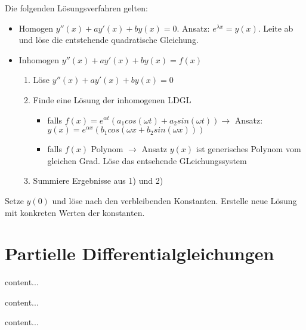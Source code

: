 \begin{satz}
	Die folgenden Lösungsverfahren gelten:
	
	\begin{itemize}
		\item Homogen $y''(x) + a y'(x) + b y(x) = 0$. Ansatz: $e^{\lambda x} = y(x)$. Leite ab und löse die entstehende quadratische Gleichung.
		\item Inhomogen $y''(x) + a y'(x) + b y(x) = f(x) $
		\begin{enumerate} [noitemsep]
			\item Löse $y''(x) + a y'(x) + b y(x) = 0$
			\item Finde eine Lösung der inhomogenen LDGL 
			\begin{itemize}
				\item falls $f(x) = e^{\alpha t} (a_1 cos(\omega t) + a_2 sin(\omega t)) \rightarrow $ Ansatz: $y(x) = e^{\alpha x} (b_1 cos(\omega x + b_2 sin(\omega x)))$
				\item falls $f(x)$ Polynom $\rightarrow$ Ansatz $y(x)$ ist generisches Polynom vom gleichen Grad. Löse das entsehende GLeichungssystem
			\end{itemize}
			\item Summiere Ergebnisse aus 1) und 2)
		\end{enumerate}
	\end{itemize}
\end{satz}

\begin{definition}[Anfangswertproblem]
	Setze $y(0)$ und löse nach den verbleibenden Konstanten. Erstelle neue Lösung mit konkreten Werten der konstanten.
\end{definition}

\pagebreak

\section{Partielle Differentialgleichungen}

\begin{definition}
	content...
\end{definition}

\begin{definition}
	content...
\end{definition}

\begin{definition}
	content...
\end{definition}

